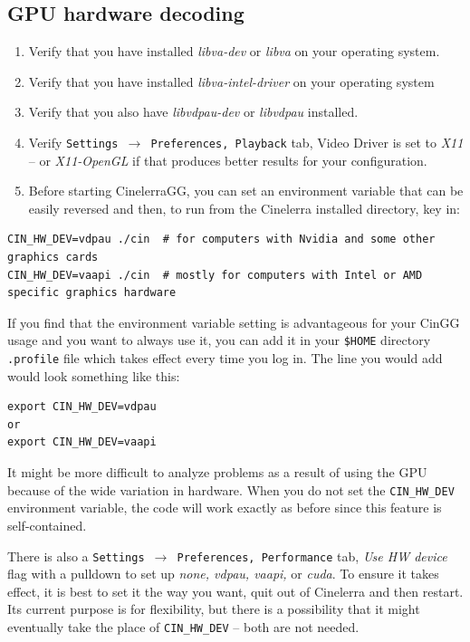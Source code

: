\subsection{GPU hardware decoding}%
\label{sub:gpu_hardware_decoding}

\begin{enumerate}
	\item Verify that you have installed \textit{libva-dev} or \textit{libva} on your operating system.
	\item Verify that you have installed \textit{libva-intel-driver} on your operating system
        \item Verify that you also have \textit{libvdpau-dev} or \textit{libvdpau} installed.
	\item Verify \texttt{Settings $\rightarrow$ Preferences, Playback} tab, Video Driver is set to\textit{ X11} -- or \textit{X11-OpenGL} if that	produces better results for your configuration.
	\item Before starting CinelerraGG, you can set an environment variable that can be easily reversed and
	then, to run from the Cinelerra installed directory, key in:
\end{enumerate}

\begin{lstlisting}[numbers=none]
CIN_HW_DEV=vdpau ./cin	# for computers with Nvidia and some other graphics cards
CIN_HW_DEV=vaapi ./cin	# mostly for computers with Intel or AMD specific graphics hardware
\end{lstlisting}

If you find that the environment variable setting is advantageous for your CinGG usage and you want to always use it, you can add it in your \texttt{\$HOME} directory \texttt{.profile} file which takes effect every time you log in.  The line you would add would look something like this:

\begin{lstlisting}[numbers=none]
export CIN_HW_DEV=vdpau
or
export CIN_HW_DEV=vaapi
\end{lstlisting}

It might be more difficult to analyze problems as a result of using the GPU because of the wide variation in hardware.  When you do not set the \texttt{CIN\_HW\_DEV} environment variable, the code will work exactly as before since this feature is self-contained.

There is also a \texttt{Settings $\rightarrow$ Preferences, Performance} tab, \textit{Use HW device} flag
with a pulldown to set up \textit{none, vdpau, vaapi,} or \textit{cuda}.  To ensure it takes effect, it is best to set it the way you want, quit out of Cinelerra and then restart.  Its current purpose is for flexibility, but there is a possibility that it might eventually take the place of \texttt{CIN\_HW\_DEV} -- both are not needed.

